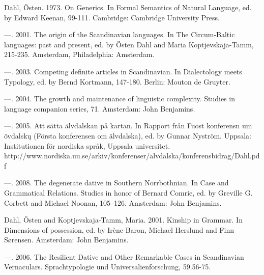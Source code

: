 Dahl, Östen. 1973. On Generics. In Formal Semantics of Natural Language, ed. by Edward Keenan, 99-111. Cambridge: Cambridge University Press.


—. 2001. The origin of the Scandinavian languages. In The Circum-Baltic languages: past and present, ed. by Östen Dahl and Maria Koptjevskaja-Tamm, 215-235. Amsterdam, Philadelphia: Amsterdam.


—. 2003. Competing definite articles in Scandinavian. In Dialectology meets Typology, ed. by Bernd Kortmann, 147-180. Berlin: Mouton de Gruyter.


—. 2004. The growth and maintenance of linguistic complexity. Studies in language companion series, 71. Amsterdam: John Benjamins.


—. 2005. Att sätta älvdalskan på kartan. In Rapport från Fuost konferensn um övdalsk\k{u} (Första konferensen om älvdalska), ed. by Gunnar Nyström. Uppsala: Institutionen för nordiska språk, Uppsala universitet. http://www.nordiska.uu.se/arkiv/konferenser/alvdalska/konferensbidrag/Dahl.pdf 


—. 2008. The degenerate dative in Southern Norrbothnian. In Case and Grammatical Relations. Studies in honor of Bernard Comrie, ed. by Greville G. Corbett and Michael Noonan, 105–126. Amsterdam: John Benjamins.


Dahl, Östen and Koptjevskaja-Tamm, Maria. 2001. Kinship in Grammar. In Dimensions of possession, ed. by Irène Baron, Michael Herslund and Finn Sørensen. Amsterdam: John Benjamins.


—. 2006. The Resilient Dative and Other Remarkable Cases in Scandinavian Vernaculars. Sprachtypologie und Universalienforschung, 59.56-75.



